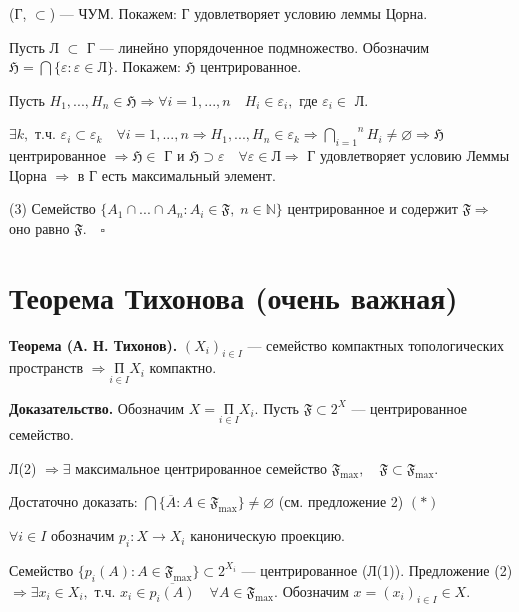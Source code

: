 \documentclass[12pt,a4paper]{article}
\begin{document}
(Г, $\subset$) --- ЧУМ. Покажем: Г удовлетворяет условию леммы Цорна.

Пусть Л $\subset$ Г --- линейно упорядоченное подмножество. Обозначим $\mathfrak{H} = \bigcap \{\varepsilon\!: \varepsilon \in \text{Л}\}.$ Покажем: $\mathfrak{H}$ центрированное. 

Пусть $H_{1}, ..., H_{n} \in \mathfrak{H} \Rightarrow \forall i  = 1, ..., n \quad H_{i} \in \varepsilon_{i},$ где $\varepsilon_{i} \in$ Л. 

$\exists k,$ т.ч. $\varepsilon_{i} \subset \varepsilon_{k} \quad \forall i = 1, ..., n \Rightarrow H_{1}, ..., H_{n} \in \varepsilon_{k} \Rightarrow \overset{n}{\underset{i = 1}{\bigcap}} H_{i} \neq \varnothing \Rightarrow \mathfrak{H}$ центрированное $\Rightarrow \mathfrak{H} \in$ Г и $\mathfrak{H} \supset \varepsilon \quad \forall \varepsilon \in \text{Л} \Rightarrow$ Г удовлетворяет условию Леммы Цорна $\Rightarrow$ в Г есть максимальный элемент. 

(3) Семейство $\{A_{1} \cap ... \cap A_{n}\!: A_{i} \in \mathfrak{F}, \; n \in \mathbb{N}\}$ центрированное и содержит $\mathfrak{F} \Rightarrow$ оно равно $\mathfrak{F}. \quad \square$

\section{Теорема Тихонова (очень важная)}

\textbf{Теорема (А. Н. Тихонов).} $(X_{i})_{i \in I}$ --- семейство компактных топологических пространств $\Rightarrow \underset{i \in I}{\text{П}} X_{i}$ компактно.

\textbf{Доказательство.} Обозначим $X = \underset{i \in I}{\text{П}} X_{i}.$ Пусть $\mathfrak{F} \subset 2^{X}$ --- центрированное семейство. 

Л(2) $\Rightarrow \exists$ максимальное центрированное семейство $\mathfrak{F}_{\max}, \quad \mathfrak{F} \subset \mathfrak{F}_{\max}.$

Достаточно доказать: $\bigcap \{\overline{A}\!: A \in \mathfrak{F}_{\max}\} \neq \varnothing$ (см. предложение 2) $(*)$

$\forall i \in I$ обозначим $p_{i}\!: X \to X_{i}$ каноническую проекцию. 

Семейство $\{p_{i}(A)\!: A \in \mathfrak{F}_{\max}\} \subset 2^{X_{i}}$ --- центрированное (Л(1)). Предложение (2) $\Rightarrow \exists x_{i} \in X_{i},$ т.ч. $x_{i} \in \overline{p_{i}(A)} \quad \forall A \in \mathfrak{F}_{\max}.$ Обозначим $x = (x_{i})_{i \in I} \in X.$ 
\end{document}
